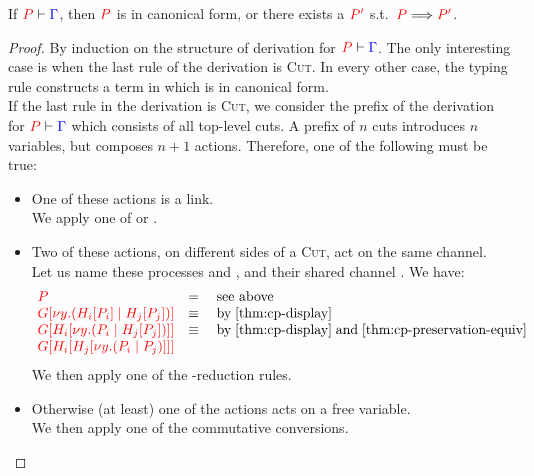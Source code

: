 \begin{theorem}[Progress]\label{thm:cp-progress}
  If $\seq[{ P }]{ \Gamma }$, then $\tm{P}$ is in canonical form, or there
  exists a $\tm{P'}$ s.t.\ $\reducesto{P}{P'}$. 
\end{theorem}
\begin{proof}
  By induction on the structure of derivation for $\seq[{ P }]{ \Gamma }$.
  The only interesting case is when the last rule of the derivation is
  \textsc{Cut}. In every other case, the typing rule constructs a term in which
  is in canonical form. 
  \\
  If the last rule in the derivation is \textsc{Cut}, we consider the prefix of
  the derivation for $\seq[{ P }]{ \Gamma}$ which consists of all top-level
  cuts. A prefix of $n$ cuts introduces $n$ variables, but composes $n+1$
  actions. Therefore, one of the following must be true: 
  \begin{itemize}
  \item
    One of these actions is a link.
    \\
    We apply one of  or .
  \item
    Two of these actions, on different sides of a \textsc{Cut}, act on the same channel.
    \\
    Let us name these processes  and , and their shared channel .
    We have:
    \[\!
      \begin{array}{ll}
        \tm{P} & = \quad \text{see above}\\
        \tm{\cpPlug{G}{\cpCut{y}{\cpPlug{H_i}{P_i}}{\cpPlug{H_j}{P_j}}}} &
        \equiv \quad \text{by} \; \cref{thm:cp-display}\\
        \tm{\cpPlug{G}{\cpPlug{H_i}{\cpCut{y}{P_i}{\cpPlug{H_j}{P_j}}}}} &
        \equiv \quad \text{by} \; \cref{thm:cp-display} \; \text{and} \; \cref{thm:cp-preservation-equiv}\\
        \tm{\cpPlug{G}{\cpPlug{H_i}{\cpPlug{H_j}{\cpCut{y}{P_i}{P_j}}}}} & 
      \end{array}
    \]
    We then apply one of the \textbeta-reduction rules.
  \item
    Otherwise (at least) one of the actions acts on a free variable.
    \\
    We then apply one of the commutative conversions.
  \end{itemize}
\end{proof}
